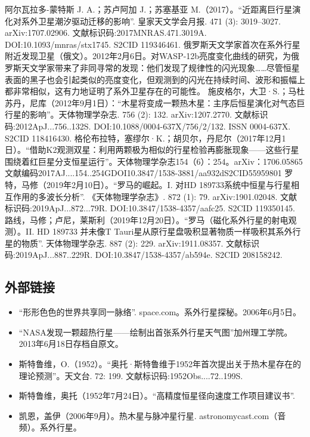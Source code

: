\begin{enumerate}
 阿尔瓦拉多-蒙特斯 J. A.；苏卢阿加 J.；苏塞基亚 M.（2017）。“近距离巨行星演化对系外卫星潮汐驱动迁移的影响”. 皇家天文学会月报. 471 (3): 3019–3027. arXiv:1707.02906. 文献标识码:2017MNRAS.471.3019A. DOI:10.1093/mnras/stx1745. S2CID 119346461.
 俄罗斯天文学家首次在系外行星附近发现卫星（俄文）。2012年2月6日。对WASP-12b亮度变化曲线的研究，为俄罗斯天文学家带来了非同寻常的发现：他们发现了规律性的闪光现象……尽管恒星表面的黑子也会引起类似的亮度变化，但观测到的闪光在持续时间、波形和振幅上都非常相似，这有力地证明了系外卫星存在的可能性。
 施皮格尔，大卫·S.；马杜苏丹，尼库（2012年9月1日）：“木星将变成一颗热木星：主序后恒星演化对气态巨行星的影响”。天体物理学杂志. 756 (2): 132. arXiv:1207.2770. 文献标识码:2012ApJ...756..132S. DOI:10.1088/0004-637X/756/2/132. ISSN 0004-637X. S2CID 118416430.
 格伦布拉特，塞缪尔·K.；胡贝尔，丹尼尔（2017年12月1日）。“借助K2观测双星：利用两颗极为相似的行星检验再膨胀现象——这些行星围绕着红巨星分支恒星运行”。天体物理学杂志154（6）：254。arXiv：1706.05865文献编码2017AJ....154..254GDOI10.3847/1538-3881/aa932dS2CID55959801
 罗特，马修（2019年2月10日）。“罗马的崛起。I. 对HD 189733系统中恒星与行星相互作用的多波长分析”. 《天体物理学杂志》. 872 (1): 79. arXiv:1901.02048. 文献标识码:2019ApJ...872...79R. DOI:10.3847/1538-4357/aafc25. S2CID 119350145.
 路线，马修；卢尼，莱斯利（2019年12月20日）。“罗马（磁化系外行星的射电观测）。II. HD 189733 并未像T Tauri星从原行星盘吸积显著物质一样吸积其系外行星的物质”. 天体物理学杂志. 887 (2): 229. arXiv:1911.08357. 文献标识码:2019ApJ...887..229R. DOI:10.3847/1538-4357/ab594e. S2CID 208158242.
\end{enumerate}
\subsection{外部链接}
\begin{itemize}
\item “形形色色的世界共享同一脉络”. space.com。系外行星探秘。2006年6月5日。
\item “NASA发现一颗超热行星——绘制出首张系外行星天气图”加州理工学院。2013年6月18日存档自原文。
\item 斯特鲁维，O.（1952）。“奥托·斯特鲁维于1952年首次提出关于热木星存在的理论预测”。天文台. 72: 199. 文献标识码:1952Obs....72..199S.
\item 斯特鲁维，奥托（1952年7月24日）。“高精度恒星径向速度工作项目建议书”.
\item 凯恩，盖伊（2006年9月）。热木星与脉冲星行星. astronomycast.com（音频）。系外行星。
\end{itemize}